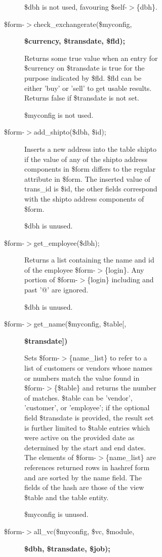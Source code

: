 \begin{description}
\begin{description}
\begin{description}
\begin{description}
\begin{description}
\begin{description}
\$dbh is not used, favouring \$self-$>$\{dbh\}.


\item[{\$form-$>$check\_exchangerate(\$myconfig,}] \textbf{\$currency, \$transdate, \$fld);}

Returns some true value when an entry for \$currency on \$transdate is true for
the purpose indicated by \$fld.  \$fld can be either 'buy' or 'sell' to get
usable results.  Returns false if \$transdate is not set.



\$myconfig is not used.


\item[{\$form-$>$add\_shipto(\$dbh, \$id);}] \mbox{}

Inserts a new address into the table shipto if the value of any of the shipto
address components in \$form differs to the regular attribute in \$form.  The
inserted value of trans\_id is \$id, the other fields correspond with the shipto
address components of \$form.



\$dbh is unused.


\item[{\$form-$>$get\_employee(\$dbh);}] \mbox{}

Returns a list containing the name and id of the employee \$form-$>$\{login\}.  Any
portion of \$form-$>$\{login\} including and past '@' are ignored.



\$dbh is unused.


\item[{\$form-$>$get\_name(\$myconfig, \$table[,}] \textbf{\$transdate])}

Sets \$form-$>$\{name\_list\} to refer to a list of customers or vendors whose names
or numbers match the value found in \$form-$>$\{\$table\} and returns the number of
matches.  \$table can be 'vendor', 'customer', or 'employee'; if the optional
field \$transdate is provided, the result set is further limited to \$table
entries which were active on the provided date as determined by the start and
end dates.  The elements of \$form-$>$\{name\_list\} are references returned rows in
hashref form and are sorted by the name field.  The fields of the hash are those
of the view \$table and the table entity.



\$myconfig is unused.


\item[{\$form-$>$all\_vc(\$myconfig, \$vc, \$module,}] \textbf{\$dbh, \$transdate, \$job);}


\end{description}
\end{description}
\end{description}
\end{description}
\end{description}
\end{description}
